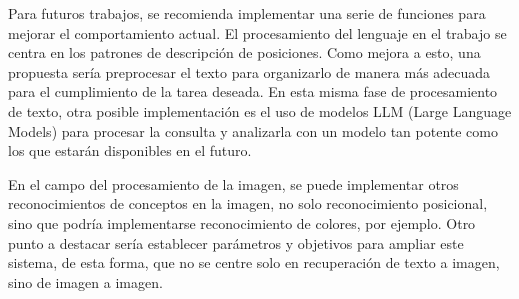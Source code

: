 \begin{recomendations}
    Para futuros trabajos, se recomienda implementar una serie de funciones para mejorar el comportamiento actual. El procesamiento del lenguaje en el trabajo se centra en los patrones de descripción de posiciones. Como mejora a esto, una propuesta sería preprocesar el texto para organizarlo de manera más adecuada para el cumplimiento de la tarea deseada. En esta misma fase de procesamiento de texto, otra posible implementación es el uso de modelos LLM (Large Language Models) para procesar la consulta y analizarla con un modelo tan potente como los que estarán disponibles en el futuro.
    
    En el campo del procesamiento de la imagen, se puede implementar otros reconocimientos de conceptos en la imagen, no solo reconocimiento posicional, sino que podría implementarse reconocimiento de colores, por ejemplo. Otro punto a destacar sería establecer parámetros y objetivos para ampliar este sistema, de esta forma, que no se centre solo en recuperación de texto a imagen, sino de imagen a imagen.
        
    \end{recomendations}
    